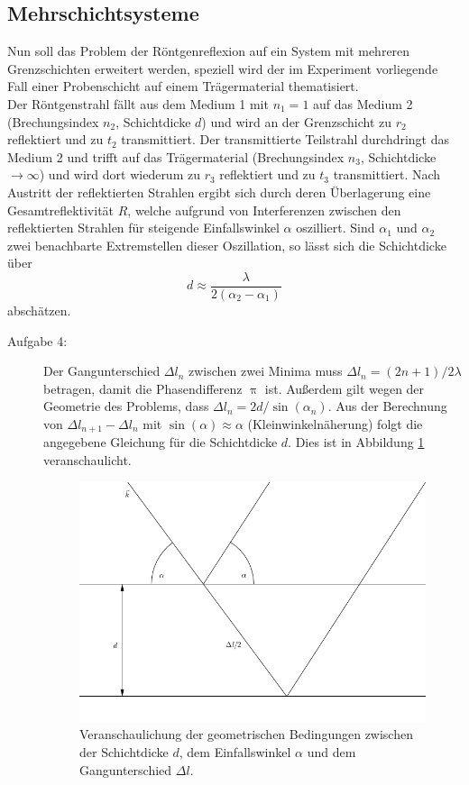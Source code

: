 \subsection{Mehrschichtsysteme}
Nun soll das Problem der Röntgenreflexion auf ein System mit mehreren
Grenzschichten erweitert werden, speziell wird der im Experiment vorliegende
Fall einer Probenschicht auf einem Trägermaterial thematisiert.\\
Der Röntgenstrahl fällt aus dem Medium 1 mit $n_1=1$ auf das Medium
2 (Brechungsindex $n_2$, Schichtdicke $d$) und wird an der Grenzschicht zu $r_2$
reflektiert und zu $t_2$
transmittiert. Der transmittierte Teilstrahl durchdringt das Medium 2 und trifft
auf das Trägermaterial (Brechungsindex $n_3$, Schichtdicke $\to \infty$) und wird
dort wiederum zu $r_3$ reflektiert und zu $t_3$ transmittiert. Nach Austritt der
reflektierten Strahlen ergibt sich durch deren Überlagerung eine
Gesamtreflektivität $R$, welche aufgrund von Interferenzen zwischen den
reflektierten Strahlen für steigende Einfallswinkel $\alpha$ oszilliert. Sind
$\alpha_1$ und $\alpha_2$ zwei benachbarte Extremstellen dieser Oszillation, so
lässt sich die Schichtdicke über
\begin{equation}
d \approx \frac{\lambda}{2(\alpha_2 -\alpha_1)}
\end{equation}
abschätzen.
\begin{description}
\item[Aufgabe 4:]
Der Gangunterschied $\Delta l_n$ zwischen zwei Minima muss $\Delta l_n=
(2n+1)/2 \lambda$ betragen, damit die Phasendifferenz $\uppi$ ist. Außerdem
gilt wegen der Geometrie des Problems, dass $\Delta l_n = 2 d/\sin(\alpha_n)$.
Aus der Berechnung von $\Delta l_{n+1}- \Delta l_n$ mit $\sin(\alpha)\approx
\alpha$ (Kleinwinkelnäherung) folgt die angegebene Gleichung für die
Schichtdicke $d$. Dies ist in Abbildung \ref{fig:Bild} veranschaulicht.
\begin{figure}[h]
\centering
\includegraphics[scale=0.4]{../skript/Bild.png}
\caption{Veranschaulichung der geometrischen Bedingungen zwischen der
Schichtdicke $d$, dem Einfallswinkel $\alpha$ und dem Gangunterschied $\Delta
l$.}
\label{fig:Bild}
\end{figure}
\end{description}
